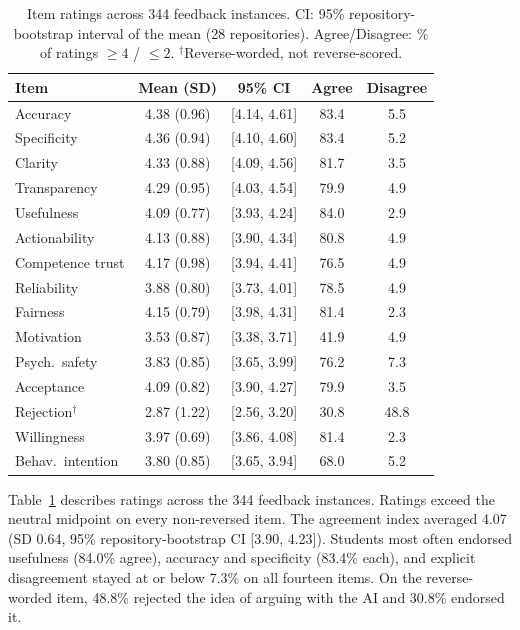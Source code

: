 \documentclass[runningheads]{llncs}
\begin{document}
\begin{table}[t]
\caption{Item ratings across 344 feedback instances. CI: 95\% repository-bootstrap interval of the mean (28 repositories). Agree/Disagree: \% of ratings $\geq4$ / $\leq2$. $^\dagger$Reverse-worded, not reverse-scored.}
\label{tab:rq1}
\centering\scriptsize
\setlength\tabcolsep{4pt}
\begin{tabular}{@{}lcccc@{}}
\toprule
Item & Mean (SD) & 95\% CI & Agree & Disagree \\
\midrule
Accuracy & 4.38 (0.96) & [4.14, 4.61] & 83.4 & 5.5 \\
Specificity & 4.36 (0.94) & [4.10, 4.60] & 83.4 & 5.2 \\
Clarity & 4.33 (0.88) & [4.09, 4.56] & 81.7 & 3.5 \\
Transparency & 4.29 (0.95) & [4.03, 4.54] & 79.9 & 4.9 \\
Usefulness & 4.09 (0.77) & [3.93, 4.24] & 84.0 & 2.9 \\
Actionability & 4.13 (0.88) & [3.90, 4.34] & 80.8 & 4.9 \\
Competence trust & 4.17 (0.98) & [3.94, 4.41] & 76.5 & 4.9 \\
Reliability & 3.88 (0.80) & [3.73, 4.01] & 78.5 & 4.9 \\
Fairness & 4.15 (0.79) & [3.98, 4.31] & 81.4 & 2.3 \\
Motivation & 3.53 (0.87) & [3.38, 3.71] & 41.9 & 4.9 \\
Psych.\ safety & 3.83 (0.85) & [3.65, 3.99] & 76.2 & 7.3 \\
Acceptance & 4.09 (0.82) & [3.90, 4.27] & 79.9 & 3.5 \\
Rejection$^\dagger$ & 2.87 (1.22) & [2.56, 3.20] & 30.8 & 48.8 \\
Willingness & 3.97 (0.69) & [3.86, 4.08] & 81.4 & 2.3 \\
Behav.\ intention & 3.80 (0.85) & [3.65, 3.94] & 68.0 & 5.2 \\
\bottomrule
\end{tabular}
\end{table}

Table~\ref{tab:rq1} describes ratings across the 344 feedback instances. Ratings exceed the neutral midpoint on every non-reversed item. The agreement index averaged 4.07 (SD 0.64, 95\% repository-bootstrap CI [3.90, 4.23]). Students most often endorsed usefulness (84.0\% agree), accuracy and specificity (83.4\% each), and explicit disagreement stayed at or below 7.3\% on all fourteen items. On the reverse-worded item, 48.8\% rejected the idea of arguing with the AI and 30.8\% endorsed it.
\end{document}
